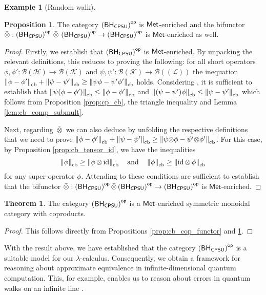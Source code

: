 \documentclass[10pt,a4paper]{amsart}
\theoremstyle{definition}
\theoremstyle{definition}
\newtheorem{example}[definition]{Example}
\theoremstyle{definition}
\theoremstyle{definition}
\newtheorem{proposition}[definition]{Proposition}
\theoremstyle{definition}
\theoremstyle{definition}
\newtheorem{theorem}[definition]{Theorem}
\begin{document}
\begin{example}[Random walk]
\begin{proposition} \label{prop:cb_cat_met_otimes_met}
  The category $\left(\mathsf{BH_{CPSU}}\right)^{\mathsf{op}}$ is $\mathsf{Met}$-enriched and the bifunctor $\bar{\otimes} : \left(\mathsf{BH_{CPSU}}\right)^{\mathsf{op}} \, \bar{\otimes} \, \left(\mathsf{BH_{CPSU}}\right)^{\mathsf{op}} \to \left(\mathsf{BH_{CPSU}}\right)^{\mathsf{op}}$ is $\mathsf{Met}$-enriched as well.
\end{proposition}

\begin{proof}
  Firstly, we establish that $\left(\mathsf{BH_{CPSU}}\right)^{\mathsf{op}}$ is $\mathsf{Met}$-enriched. By unpacking the relevant definitions, this reduces to proving the following: for all short operators $\phi, \phi' : \mathcal{B}(\mathcal{H})\to \mathcal{B}(\mathcal{K})$ and $\psi, \psi' : \mathcal{B}(\mathcal{K}) \to \mathcal{B}((\mathcal{L}))$ the inequation $\left\lVert \phi-\phi' \right\rVert_{\text{cb}} + \left\lVert \psi-\psi' \right\rVert_{\text{cb}} \geq \left\lVert \psi\phi-\psi'\phi' \right\rVert_{\text{cb}} $ holds. Considering \cite[ Proof of proposition 4.1]{dahlqvist2023syntactic},  it is sufficient to establish that $\left\lVert \psi(\phi-\phi') \right\rVert_{\text{cb}} \leq \left\lVert \phi-\phi' \right\rVert_{\text{cb}}$ and $\left\lVert (\psi-\psi')\phi \right\rVert_{\text{cb}} \leq \left\lVert \psi-\psi' \right\rVert_{\text{cb}}$ which follows from Proposition \ref{prop:cp_cb}, the triangle inequality and Lemma \ref{lem:cb_comp_submult}.

  Next, regarding $\bar{\otimes}$ we can also deduce by unfolding the respective definitions that we need to prove $ \left\lVert \phi - \phi' \right\rVert_{\text{cb}} + \left\lVert \psi - \psi' \right\rVert_{\text{cb}} \geq \left\lVert \psi \bar{\otimes} \phi - \psi' \bar{\otimes} \phi' \right\rVert_{\text{cb}}$. 
  For this case,  by Proposition \ref{prop:cb_tensor_id}, we have the inequalities  
  \[
  \left\lVert \phi \right\rVert_{\text{cb}} \geq \left\lVert  \phi \, \bar{\otimes} \, \mathrm{id}  \right\rVert_{\text{cb}}
  \quad \text{and} \quad  
 \left\lVert \phi \right\rVert_{\text{cb}}  \geq \left\lVert \mathrm{id} \, \bar{\otimes} \, \phi \right\rVert_{\text{cb}}
  \]  
  for any super-operator \( \phi \). Attending to \cite[ Proof of proposition 4.1]{dahlqvist2023syntactic} these conditions are sufficient to establish that the bifunctor $\bar{\otimes} : \left(\mathsf{BH_{CPSU}}\right)^{\mathsf{op}} \bar{\otimes} \left(\mathsf{BH_{CPSU}}\right)^{\mathsf{op}} \to \left(\mathsf{BH_{CPSU}}\right)^{\mathsf{op}}$ is $\mathsf{Met}$-enriched.
\end{proof}

\begin{theorem}
  The category $\left(\mathsf{BH_{CPSU}}\right)^{\mathsf{op}}$ is a $\mathsf{Met}$-enriched symmetric monoidal category with coproducts.
\end{theorem}

\begin{proof}
  This follows directly from Propositions \ref{prop:cb_cop_functor} and \ref{prop:cb_cat_met_otimes_met}.
\end{proof}


With the result above, we have established that the category $\left(\mathsf{BH_{CPSU}}\right)^{\mathsf{op}}$ is a suitable model for our $\lambda$-calculus. Consequently, we obtain a framework for reasoning about approximate equivalence in infinite-dimensional quantum computation. This, for example, enables us to reason about errors in quantum walks on an infinite line \cite{venegasQuantumWalksComprehensive2012}.


\end{example}
\end{document}
